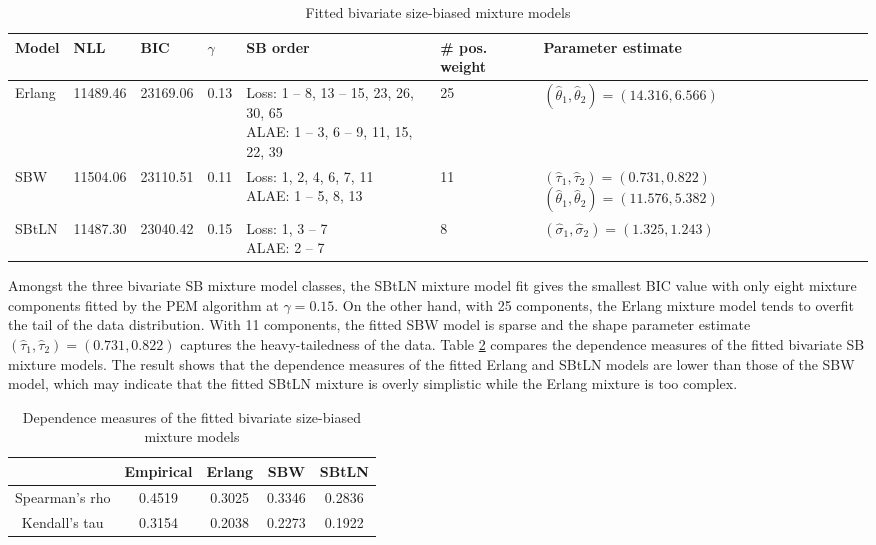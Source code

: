 \documentclass[eng]{csam}
\begin{document}
\begin{table}[t]
\scriptsize
\centering
\caption{Fitted bivariate size-biased mixture models}\label{tab:BVfits}
\tabcolsep=4pt
\begin{tabular}{lllllll}
\hline\hline
Model & NLL & BIC & $\gamma$ & SB order & \# pos. weight & Parameter estimate\\
\hline
Erlang & 11489.46 & 23169.06 & 0.13 & \makecell{Loss: 1 -- 8, 13 -- 15, 23, 26, 30, 65 \\ ALAE: 1 -- 3, 6 -- 9, 11, 15, 22, 39} & 25 & $(\hat{\theta}_1,\hat{\theta}_2) = (14.316, 6.566)$ \\
SBW & 11504.06 & 23110.51 & 0.11 & \makecell{Loss: 1, 2, 4, 6, 7, 11 \\ ALAE: 1 -- 5, 8, 13} & 11 & \makecell{$(\hat{\tau}_1, \hat{\tau}_2) = (0.731, 0.822)$\\ $(\hat{\theta}_1, \hat{\theta}_2) = (11.576, 5.382)$} \\
SBtLN & 11487.30 & 23040.42 & 0.15 & \makecell{Loss: 1, 3 -- 7 \\ ALAE: 2 -- 7} & 8 & $(\hat{\sigma}_1, \hat{\sigma}_2) = (1.325, 1.243)$ \\
\hline\hline
\end{tabular}
\end{table}

Amongst the three bivariate SB mixture model classes, the SBtLN mixture model fit gives the smallest BIC value with only eight mixture components fitted by the PEM algorithm at $\gamma = 0.15$. On the other hand, with 25 components, the Erlang mixture model tends to overfit the tail of the data distribution. With 11 components, the fitted SBW model is sparse and the shape parameter estimate $(\hat{\tau}_1, \hat{\tau}_2) = (0.731, 0.822)$ captures the heavy-tailedness of the data. Table \ref{tab_dependence_fit} compares the dependence measures of the fitted bivariate SB mixture models. The result shows that the dependence measures of the fitted Erlang and SBtLN models are lower than those of the SBW model, which may indicate that the fitted SBtLN mixture is overly simplistic while the Erlang mixture is too complex.

\begin{table}[t]
\footnotesize
\centering
\caption{Dependence measures of the fitted bivariate size-biased mixture models}\label{tab_dependence_fit}
\begin{tabular}{ccccc}
\hline\hline
 & Empirical & Erlang & SBW & SBtLN \\
\hline
Spearman's rho & 0.4519 & 0.3025 & 0.3346 & 0.2836 \\
Kendall's tau & 0.3154 & 0.2038 & 0.2273 & 0.1922 \\
\hline\hline
\end{tabular}
\end{table}
\end{document}
